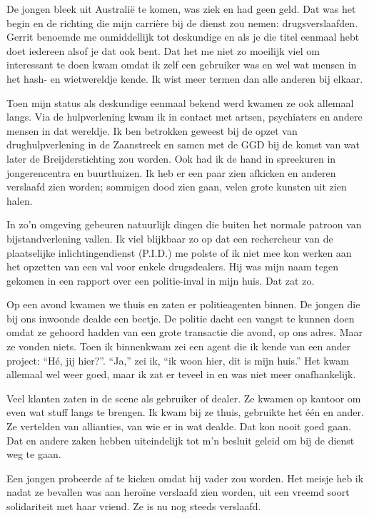 \documentclass[12pt,twoside]{memoir}
\begin{document}
De jongen bleek uit Australië te komen, was ziek en had geen geld. Dat was het begin en de richting die mijn carrière bij de dienst zou nemen: drugsverslaafden. Gerrit benoemde me onmiddellijk tot deskundige en als je die titel eenmaal hebt doet iedereen alsof je dat ook bent. Dat het me niet zo moeilijk viel om interessant te doen kwam omdat ik zelf een gebruiker was en wel wat mensen in het hash- en wietwereldje kende. Ik wist meer termen dan alle anderen bij elkaar. 

Toen mijn status als deskundige eenmaal bekend werd kwamen ze ook allemaal langs. Via de hulpverlening kwam ik in contact met artsen, psychiaters en andere mensen in dat wereldje. Ik ben betrokken geweest bij de opzet van drughulpverlening in de Zaanstreek en samen met de GGD bij de komst van wat later de Breijderstichting zou worden. Ook had ik de hand in spreekuren in jongerencentra en buurthuizen. Ik heb er een paar zien afkicken en anderen verslaafd zien worden; sommigen dood zien gaan, velen grote kunsten uit zien halen. 

In zo’n omgeving gebeuren natuurlijk dingen die buiten het normale patroon van bijstandverlening vallen. Ik viel blijkbaar zo op dat een rechercheur van de plaatselijke  inlichtingendienst (P.I.D.) me polste of ik niet mee kon werken aan het opzetten van een val voor enkele drugsdealers. Hij was mijn naam tegen gekomen in een rapport over een politie-inval in mijn huis. Dat zat zo. 

Op een avond kwamen we thuis en zaten er politieagenten binnen. De jongen die bij ons inwoonde dealde een beetje. De politie dacht een vangst te kunnen doen omdat ze gehoord hadden van een grote transactie die avond, op ons adres. Maar ze vonden niets. Toen ik binnenkwam zei een agent die ik kende van een ander project: ``Hé, jij hier?''. ``Ja,'' zei ik, ``ik woon hier, dit is mijn huis.'' Het kwam allemaal wel weer goed, maar ik zat er teveel in en was niet meer onafhankelijk. 

Veel klanten zaten in de scene als gebruiker of dealer. Ze kwamen op kantoor om even wat stuff langs te brengen. Ik kwam bij ze thuis, gebruikte het één en ander. Ze vertelden van allianties, van wie er in wat dealde. Dat kon nooit goed gaan. Dat en andere zaken hebben uiteindelijk tot m’n besluit geleid om bij de dienst weg te gaan. 

Een jongen probeerde af te kicken omdat hij vader zou worden. Het meisje heb ik nadat ze bevallen was aan heroïne verslaafd zien worden, uit een vreemd soort solidariteit met haar vriend. Ze is nu nog steeds verslaafd. 
\end{document}
